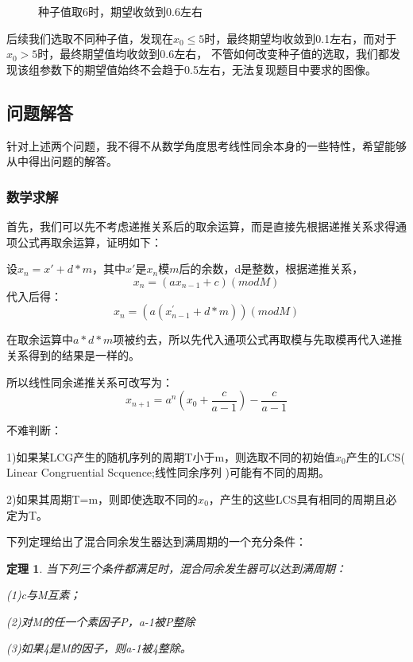 \documentclass[12pt,a4paper]{article}%
\newtheorem{theorem}{\indent 定理}[section]
\begin{document}
\begin{figure}[H]
\begin{minipage}{0.48\textwidth}
            \caption{\fontsize{10pt}{15pt}\selectfont 种子值取6时，期望收敛到0.6左右}
        \end{minipage}\label{fig:figure3}
    \end{figure}

    后续我们选取不同种子值，发现在$x_0\leq 5$时，最终期望均收敛到0.1左右，而对于$x_0 > 5$时，最终期望值均收敛到0.6左右，
    不管如何改变种子值的选取，我们都发现该组参数下的期望值始终不会趋于0.5左右，无法复现题目中要求的图像。


    \subsection{问题解答}
    针对上述两个问题，我不得不从数学角度思考线性同余本身的一些特性，希望能够从中得出问题的解答。

    \subsubsection{数学求解}
    首先，我们可以先不考虑递推关系后的取余运算，而是直接先根据递推关系求得通项公式再取余运算，证明如下：

    设$x_n=x'+d*m$，其中$x'$是$x_n$模$m$后的余数，d是整数，根据递推关系，
    \[x_n = (ax_{n-1}+c)    (mod M) \]
    代入后得：
    \[x_n = (a(x_{n-1}^{'}+d*m))(mod M)\]

    在取余运算中$a*d*m$项被约去，所以先代入通项公式再取模与先取模再代入递推关系得到的结果是一样的。

    所以线性同余递推关系可改写为：
    \begin{equation}
        x_{n+1}=a^n(x_0+\frac{c}{a-1})-\frac{c}{a-1}
    \end{equation}

    不难判断：


    1)如果某LCG产生的随机序列的周期T小于m，则选取不同的初始值$x_0$产生的LCS(
    Linear Congruential Scquence;线性同余序列
    )可能有不同的周期。

    2)如果其周期T=m，则即使选取不同的$x_0$，产生的这些LCS具有相同的周期且必定为T。


    下列定理给出了混合同余发生器达到满周期的一个充分条件：
    \begin{theorem}
        当下列三个条件都满足时，混合同余发生器可以达到满周期：

        \hspace{2cm}(1)c与M互素；

        \hspace{2cm}(2)对M的任一个素因子P，a-1被P整除

        \hspace{2cm}(3)如果4是M的因子，则a-1被4整除。
    \end{theorem}
\end{document}
